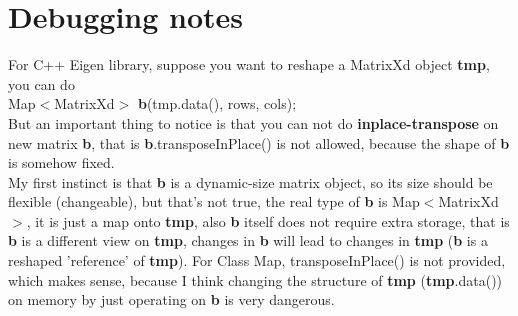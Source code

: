 \section{Debugging notes}

\noindent For C++ Eigen library, suppose you want to reshape a MatrixXd object \textbf{tmp}, you can do \\
Map$<$MatrixXd$>$ \textbf{b}(tmp.data(), rows, cols); \\
But an important thing to notice is that you can not do \textbf{inplace-transpose} on new matrix \textbf{b}, that is \textbf{b}.transposeInPlace() is not allowed, because the shape of \textbf{b} is somehow fixed.\\

\noindent My first instinct is that \textbf{b} is a dynamic-size matrix object, so its size should be flexible (changeable), but that's not true, the real type of \textbf{b} is Map$<$MatrixXd$>$, it is just a map onto \textbf{tmp}, also \textbf{b} itself does not require extra storage, that is \textbf{b} is a different view on \textbf{tmp}, changes in \textbf{b} will lead to changes in \textbf{tmp} (\textbf{b} is a reshaped 'reference' of \textbf{tmp}). For Class Map, transposeInPlace() is not provided, which makes sense, because I think changing the structure of \textbf{tmp} (\textbf{tmp}.data()) on memory by just operating on \textbf{b} is very dangerous. 
